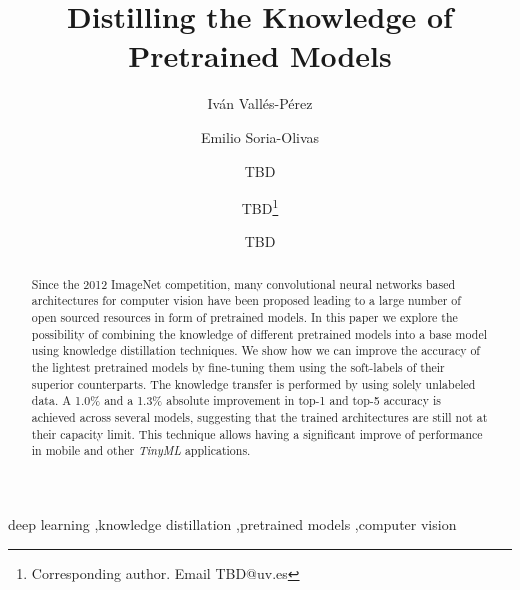 \documentclass{elsarticle}
\begin{document}
	\begin{frontmatter}
		\title{Distilling the Knowledge of Pretrained Models}
		\author[UV]{Iván Vallés-Pérez}
		\author[UV]{Emilio Soria-Olivas}
		\author[UV]{TBD}
		\author[UV]{TBD\footnote{Corresponding author. Email TBD@uv.es}}
		\author[UV]{TBD}
		\address[UV]{Escola Tècnica Superior d\textsc{}Enginyeria, University of Valencia, Avenida de la Universitat s/n 46100 Burjassot, Valencia, Spain}

		\begin{abstract}
		Since the 2012 ImageNet competition, many convolutional neural networks based architectures for computer vision have been proposed leading to a large number of open sourced resources in form of pretrained models. In this paper we explore the possibility of combining the knowledge of different pretrained models into a base model using knowledge distillation techniques. We show how we can improve the accuracy of the lightest pretrained models by fine-tuning them using the soft-labels of their superior counterparts. The knowledge transfer is performed by using solely unlabeled data. A 1.0\% and a 1.3\% absolute improvement in top-1 and top-5 accuracy is achieved across several models, suggesting that the trained architectures are still not at their capacity limit. This technique allows having a significant improve of performance in mobile and other \textit{TinyML} applications.
		\end{abstract}
		
		\begin{keyword}
			deep learning \sep knowledge distillation \sep pretrained models \sep computer vision  
		\end{keyword}
		
	\end{frontmatter}
	
	\linenumbers
	
\end{document}
